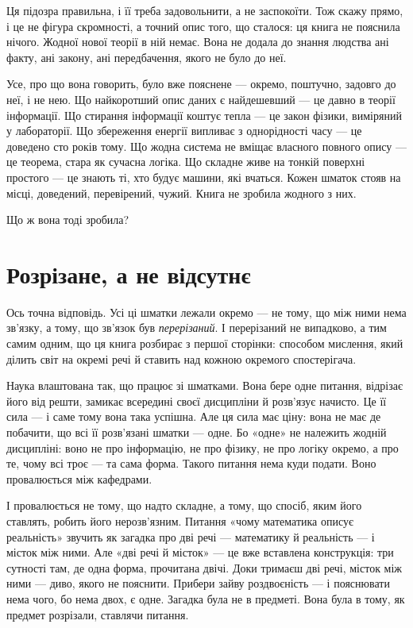 \documentclass[12pt, a4paper, openany]{book}
\begin{document}
Ця підозра правильна, і її треба задовольнити, а не заспокоїти. Тож скажу прямо, і це не фігура скромності, а точний опис того, що сталося: ця книга не пояснила нічого. Жодної нової теорії в ній немає. Вона не додала до знання людства ані факту, ані закону, ані передбачення, якого не було до неї.

Усе, про що вона говорить, було вже пояснене --- окремо, поштучно, задовго до неї, і не нею. Що найкоротший опис даних є найдешевший --- це давно в теорії інформації. Що стирання інформації коштує тепла --- це закон фізики, виміряний у лабораторії. Що збереження енергії випливає з однорідності часу --- це доведено сто років тому. Що жодна система не вміщає власного повного опису --- це теорема, стара як сучасна логіка. Що складне живе на тонкій поверхні простого --- це знають ті, хто будує машини, які вчаться. Кожен шматок стояв на місці, доведений, перевірений, чужий. Книга не зробила жодного з них.

Що ж вона тоді зробила?

\section{Розрізане, а не відсутнє}

Ось точна відповідь. Усі ці шматки лежали окремо --- не тому, що між ними нема зв'язку, а тому, що зв'язок був \emph{перерізаний}. І перерізаний не випадково, а тим самим одним, що ця книга розбирає з першої сторінки: способом мислення, який ділить світ на окремі речі й ставить над кожною окремого спостерігача.

Наука влаштована так, що працює зі шматками. Вона бере одне питання, відрізає його від решти, замикає всередині своєї дисципліни й розв'язує начисто. Це її сила --- і саме тому вона така успішна. Але ця сила має ціну: вона не має де побачити, що всі її розв'язані шматки --- одне. Бо «одне» не належить жодній дисципліні: воно не про інформацію, не про фізику, не про логіку окремо, а про те, чому всі троє --- та сама форма. Такого питання нема куди подати. Воно провалюється між кафедрами.

І провалюється не тому, що надто складне, а тому, що спосіб, яким його ставлять, робить його нерозв'язним. Питання «чому математика описує реальність» звучить як загадка про дві речі --- математику й реальність --- і місток між ними. Але «дві речі й місток» --- це вже вставлена конструкція: три сутності там, де одна форма, прочитана двічі. Доки тримаєш дві речі, місток між ними --- диво, якого не пояснити. Прибери зайву роздвоєність --- і пояснювати нема чого, бо нема двох, є одне. Загадка була не в предметі. Вона була в тому, як предмет розрізали, ставлячи питання.
\end{document}
